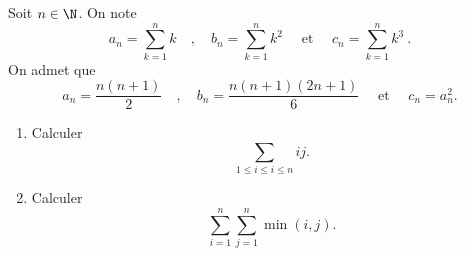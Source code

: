 	Soit $n\in \N$. On note  
	\[
		a_n = \sum_{k=1}^n k
		\quad , \quad 
		b_n = \sum_{k=1}^n k^2
		\quad \mbox{ et }\quad 
		c_n = \sum_{k=1}^n k^3 \ .
	\]
	On admet que
		\[
		a_n = \frac{n(n+1)}{2}
		\quad , \quad 
		b_n = \frac{n(n+1)(2n+1)}{6}
		\quad \mbox{ et }\quad 
		c_n = a_n^2 .
	\]
	\begin{enumerate}
		\item Calculer $$\sum_{1\leqslant i \leqslant i \leqslant n} ij.$$		
		\item Calculer $$ \sum_{i=1}^n \sum_{j=1}^n \min(i,j).$$
	\end{enumerate}